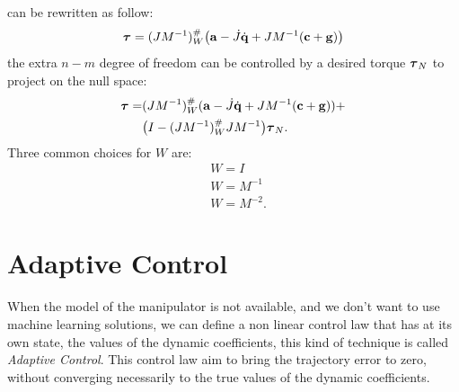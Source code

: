\documentclass[10pt, a4paper]{report}
\begin{document}
can be rewritten as follow:
\begin{equation}
    {\boldsymbol{\tau}}=(JM^{-1})^\#_W\big(\mathbf a-\dot J{\dot{\mathbf q}}+JM^{-1}(\mathbf c+\mathbf g )\big)
\end{equation}
the extra $n-m$ degree of freedom can be controlled by a desired torque ${\boldsymbol{\tau}}_N$ to project on the null space:
\begin{align}
    {\boldsymbol{\tau}}=&(JM^{-1})^\#_W(\mathbf a-\dot J{\dot{\mathbf q}}+JM^{-1}(\mathbf c+\mathbf g ))+\\ 
    &\big(I-(JM^{-1})^\#_WJM^{-1}\big)
    {\boldsymbol{\tau}}_N.
\end{align}
Three common choices for $W$ are:\begin{align}
    &W=I\\ &W=M^{-1}\\ &W=M^{-2}.
\end{align}
\section{Adaptive Control}
When the model of the manipulator is not available, and we don't want to use machine learning solutions, we can define a non linear control law that has at its own state, the values of the dynamic coefficients, this kind of technique is called \textit{Adaptive Control}. This control law aim to bring the trajectory error to zero, without converging necessarily to the true values of the dynamic coefficients.
\end{document}
